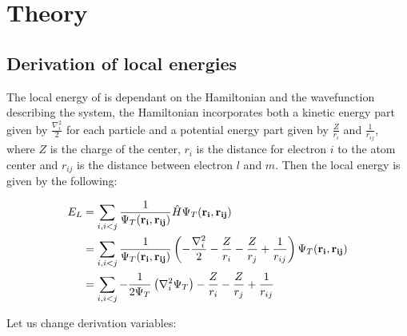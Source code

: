 \documentclass[x11names]{article}
\begin{document}
\section{Theory}

	

	

	

	

	

	\subsection{Derivation of local energies}
		The local energy of is dependant on the Hamiltonian and the wavefunction describing the system, the Hamiltonian incorporates both a kinetic energy part given by \( \frac{\nabla_i^2}{2} \) for each particle
		and a potential energy part given by \(\frac{Z}{r_i}\) and \(\frac{1}{r_{ij}}\), where \(Z\) is the charge of the center, \(r_i\) is the distance for electron \(i\) to the atom center and \(r_{ij}\) is the distance between electron \(l\) and \(m\). Then the local energy is given by the following:

		\begin{align}
			E_L &= \sum_{i,i<j}{\frac{1}{ \Psi_T(\vb{r_i} , \vb{r_{ij}}) } \hat{H} \Psi_T(\vb{r_i} , \vb{r_{ij}})}
			\\
			&=	\sum_{i,i<j}\frac{1}{ \Psi_T(\vb{r_i} , \vb{r_{ij}}) } \left( - \frac{\nabla_i^2}{2} -\frac{Z}{r_i}  -  \frac{Z}{r_j} +  \frac{1}{r_{ij} }  \right) \Psi_T(\vb{r_i} , \vb{r_{ij}})
			\\
			&= \sum_{i,i<j}{-\frac{1}{2\Psi_T} \left(\nabla_i^2 \Psi_T  \right)  -\frac{Z}{r_i}  -  \frac{Z}{r_j} +  \frac{1}{r_{ij} }}
		\end{align}

		Let us change derivation variables:
\end{document}

